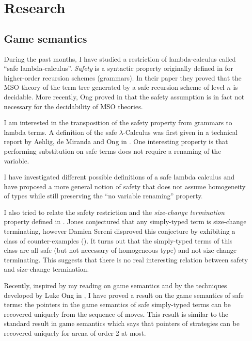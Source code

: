 \section{Research}

\subsection{Game semantics}

During the past months, I have studied a restriction of
lambda-calculus called ``safe lambda-calculus''. \emph{Safety} is a
syntactic property originally defined in \cite{KNU02} for
higher-order recursion schemes (grammars). In their paper they
proved that the MSO theory of the term tree generated by a safe
recursion scheme of level $n$ is decidable. More recently, Ong
proved in \cite{OngLics2006} that the safety assumption is in fact
not necessary for the decidability of MSO theories.

I am interested in the transposition of the safety property from
grammars to lambda terms. A definition of the safe
$\lambda$-Calculus was first given in a technical report by Aehlig,
de Miranda and Ong in \cite{safety-mirlong2004}. One interesting
property is that performing substitution on safe terms does not
require a renaming of the variable.

I have investigated different possible definitions of a safe lambda
calculus and have proposed a more general notion of safety that does
not assume homogeneity of types while still preserving  the ``no
variable renaming'' property.

I also tried to relate the safety restriction and the
\emph{size-change termination} property defined in
\cite{jones01,jones04}. Jones conjectured that any simply-typed term
is size-change terminating, however Damien Sereni disproved this
conjecture by exhibiting a class of counter-examples
(\cite{serenistypesct05}). It turns out that the simply-typed terms
of this class are all safe (but not necessary of homogeneous type)
and not size-change terminating. This suggests that there is no real
interesting relation between safety and size-change termination.


Recently, inspired by my reading on game semantics
\citep{abramsky:game-semantics-tutorial} and by the techniques
developed by Luke Ong in \citep{OngLics2006}, I have proved a result
on the game semantics of safe terms: the pointers in the game
semantics of safe simply-typed terms can be recovered uniquely from
the sequence of moves. This result is similar to the standard result
in game semantics which says that pointers of strategies can be
recovered uniquely for arena of order 2 at most.


